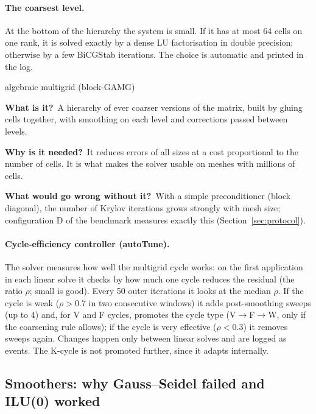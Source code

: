 \documentclass[11pt,a4paper]{article}
\newcommand{\bbwhat}{\par\smallskip\noindent\textbf{What is it?}\ }
\newcommand{\bbwhy}{\par\smallskip\noindent\textbf{Why is it needed?}\ }
\newcommand{\bbwithout}{\par\smallskip\noindent\textbf{What would go wrong
  without it?}\ }
\begin{document}
\paragraph{The coarsest level.} At the bottom of the hierarchy the system is
small. If it has at most 64 cells on one rank, it is solved exactly by a
dense LU factorisation in double precision; otherwise by a few BiCGStab
iterations. The choice is automatic and printed in the log.

\begin{bblock}{algebraic multigrid (block-GAMG)}
\bbwhat A hierarchy of ever coarser versions of the matrix, built by gluing
cells together, with smoothing on each level and corrections passed
between levels.
\bbwhy It reduces errors of all sizes at a cost proportional to the number
of cells. It is what makes the solver usable on meshes with millions of
cells.
\bbwithout With a simple preconditioner (block diagonal), the number of
Krylov iterations grows strongly with mesh size; configuration D of the
benchmark measures exactly this (Section~\ref{sec:protocol}).
\end{bblock}

\paragraph{Cycle-efficiency controller (autoTune).} The solver measures
how well the multigrid cycle works: on the first application in each
linear solve it checks by how much one cycle reduces the residual (the
ratio $\rho$; small is good). Every 50 outer iterations it looks at the
median $\rho$. If the cycle is weak ($\rho>0.7$ in two consecutive windows)
it adds post-smoothing sweeps (up to 4) and, for V and F cycles, promotes
the cycle type (V$\to$F$\to$W, only if the coarsening rule allows); if the
cycle is very effective ($\rho<0.3$) it removes sweeps again. Changes happen
only between linear solves and are logged as events. The K-cycle is not
promoted further, since it adapts internally.

\subsection{Smoothers: why Gauss--Seidel failed and ILU(0) worked}\label{sec:smoothers}
\end{document}
